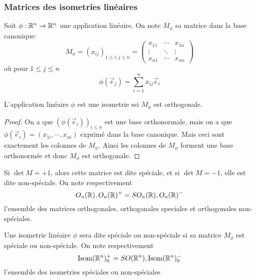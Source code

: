 \subsubsection{Matrices des isometries linéaires}

Soit $\phi: \mathbb{R}^n \to \mathbb{R}^n$ une application linéaire. On note $M_\phi$ sa matrice
dans la base canonique:
\begin{equation*}
	M_\phi = (x_{ij})_{1\leq i,j\leq n} =
	\begin{pmatrix}
		x_{11} & \cdots & x_{1n} \\
		\vdots & \ddots & \vdots \\
		x_{n1} & \cdots & x_{nn}
	\end{pmatrix}
\end{equation*}
où pour $1 \leq j \leq n$
\begin{equation*}
	\phi(\vec{e}_j) = \sum_{i=1}^n x_{ij}\vec{e}_i
\end{equation*}

\begin{theorem}
	L'application linéaire $\phi$ est une isometrie ssi $M_{\phi}$ est
	orthogonale.
\end{theorem}

\begin{proof}
	On a que $(\phi(\vec{e}_i))_{i\leq n}$ est une base orthonormale, mais on a
	que $\phi(\vec{e}_i) = (x_{1i}, \cdots, x_{ni})$ exprimé dans la base
	canonique. Mais ceci sont exactement les colonnes de $M_\phi$. Ainsi les
	colonnes de $M_\phi$ forment une base orthonormée et donc $M_\phi$ est
	orthogonale.
\end{proof}

\begin{definition}
	Si $\det M = +1$, alors cette matrice est dite spéciale, et si $\det M = -1$,
	elle est dite non-spéciale. On note respectivement
	\begin{equation*}
		O_n(\mathbb{R}), O_n(\mathbb{R})^+ = SO_n(\mathbb{R}), O_n(\mathbb{R})^-
	\end{equation*}
	l'ensemble des matrices orthogonales, orthogonales speciales et orthogonales
	non-spéciales.
\end{definition}

\begin{definition}
	Une isometrie linéaire $\phi$ sera dite spéciale ou non-spéciale si sa
	matrice $M_\phi$ est spéciale ou non-spéciale. On note respectivement
	\begin{equation*}
		\operatorname{Isom}(\mathbb{R}^n)^+_0 = SO(\mathbb{R}^n), \operatorname{Isom}(\mathbb{R}^n)^-_0
	\end{equation*}
	l'ensemble des isometries spéciales ou non-spéciales
\end{definition}

